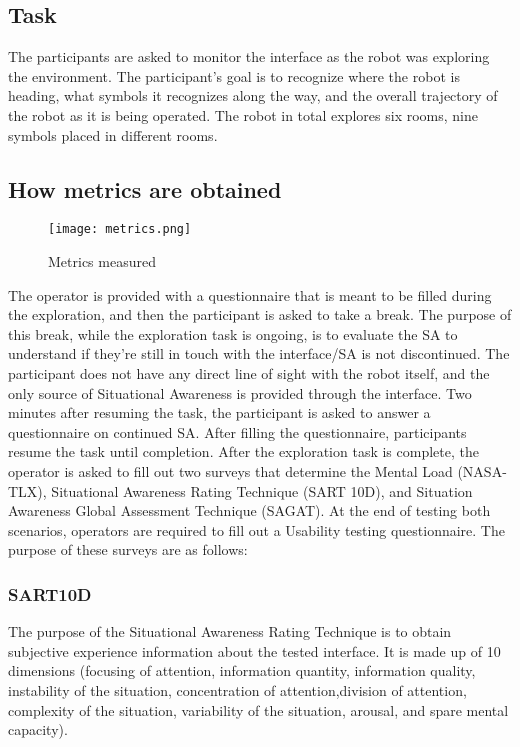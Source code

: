 \documentclass[conference]{IEEEtran}
\begin{document}
    \subsection{Task} The participants are asked to monitor the interface as the robot was exploring the environment. The participant’s goal is to recognize where the robot is heading, what symbols it recognizes along the way, and the overall trajectory of the robot as it is being operated.  The robot in total explores six rooms, nine symbols placed in different rooms. 

    \subsection{How metrics are obtained}
    
    \begin{figure}[h]
\texttt{[image: metrics.png]}
\caption{Metrics measured}
\end{figure}

The operator is provided with a questionnaire that is meant to be filled during the exploration, and then the participant is asked to take a break. The purpose of this break, while the exploration task is ongoing, is to evaluate the SA to understand if they’re still in touch with the interface/SA is not discontinued. The participant does not have any direct line of sight with the robot itself, and the only source of Situational Awareness is provided through the interface. Two minutes after resuming the task, the participant is asked to answer a questionnaire on continued SA. After filling the questionnaire, participants resume the task until completion. After the exploration task is complete, the operator is asked to fill out two surveys that determine the Mental Load (NASA-TLX), Situational Awareness Rating Technique (SART 10D), and Situation Awareness Global Assessment Technique (SAGAT). At the end of testing both scenarios, operators are required to fill out a Usability testing questionnaire. The purpose of these surveys are as follows:

\subsubsection{SART10D} 
The purpose of the Situational Awareness Rating Technique is to obtain subjective experience information about the tested interface. It is made up of 10 dimensions (focusing of attention, information quantity, information quality, instability of the situation, concentration of attention,division of attention, complexity of the situation, variability of the situation, arousal, and spare mental capacity). \cite{b25}
\end{document}
